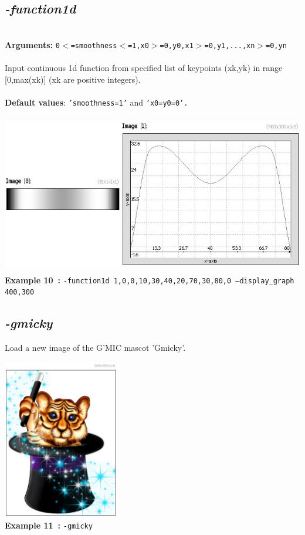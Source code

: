 \documentclass[a4paper,11pt,twoside]{book}
\begin{document}
\subsection{\emph{-function1d} }\vspace*{-0.5em}
~\\\textbf{Arguments: } 
{\small \texttt{0$<$=smoothness$<$=1,x0$>$=0,y0,x1$>$=0,y1,...,xn$>$=0,yn}}\\~\\
Input continuous 1d function from specified list of keypoints (xk,yk)
in range [0,max(xk)] (xk are positive integers).
~\\~\\\textbf{Default values}: {\small \texttt{'smoothness=1'} and \texttt{'x0=y0=0'.}}
\begin{center}\includegraphics[keepaspectratio=true,height=7cm,width=\textwidth]{img/gmic_def10.jpg}\\
{\footnotesize \textbf{Example 10~:} \texttt{-function1d 1,0,0,10,30,40,20,70,30,80,0 --display\_graph 400,300}}
\end{center}

\subsection{\emph{-gmicky} }\vspace*{-0.5em}
Load a new image of the G'MIC mascot 'Gmicky'.
\begin{center}\includegraphics[keepaspectratio=true,height=7cm,width=\textwidth]{img/gmic_def11.jpg}\\
{\footnotesize \textbf{Example 11~:} \texttt{-gmicky}}
\end{center}
\end{document}
